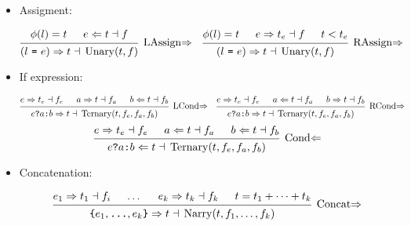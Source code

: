 \documentclass{article}
\DeclareMathOperator{\Unary}{Unary}
\DeclareMathOperator{\Ternary}{Ternary}
\DeclareMathOperator{\Narry}{Narry}
\renewcommand{\S}{\ensuremath{\Rightarrow}}
\newcommand{\C}{\ensuremath{\Leftarrow}}
\newcommand{\s}[3]{#1 \S{} #2 \dashv{} #3}
\renewcommand{\c}[3]{#1 \C{} #2 \dashv{} #3}
\begin{document}
\begin{itemize}[leftmargin=*]
	\item Assigment:

	      \begin{align*}
		       &
		      \begin{prooftree}
			      \hypo{\phi(l) = t}
			      \hypo{\c{e}{t}{f}}
			      \infer2[LAssign\S]{\s{(l~\texttt{=}~e)}{t}{\Unary(t, f)}}
		      \end{prooftree}
		       &
		       &
		      \begin{prooftree}
			      \hypo{\phi(l) = t}
			      \hypo{\s{e}{t_e}{f}}
			      \hypo{t < t_e}
			      \infer3[RAssign\S]{\s{(l~\texttt{=}~e)}{t}{\Unary(t, f)}}
		      \end{prooftree}
	      \end{align*}


	\item If expression:

	      \begin{align*}
		       &
		      \begin{prooftree}
			      \hypo{\s{e}{t_e}{f_e}}
			      \hypo{\s{a}{t}{f_a}}
			      \hypo{\c{b}{t}{f_b}}
			      \infer3[LCond\S]{\s{e \texttt{?} a \texttt{:} b}{t}%
				      {\Ternary(t, f_e, f_a, f_b)}}
		      \end{prooftree}
		       &
		       &
		      \begin{prooftree}
			      \hypo{\s{e}{t_e}{f_e}}
			      \hypo{\c{a}{t}{f_a}}
			      \hypo{\s{b}{t}{f_b}}
			      \infer3[RCond\S]{\s{e \texttt{?} a \texttt{:} b}{t}%
				      {\Ternary(t, f_e, f_a, f_b)}}
		      \end{prooftree}
	      \end{align*}
	      \vspace*{.5em}
	      \begin{equation*}
		      \begin{prooftree}
			      \hypo{\s{e}{t_e}{f_e}}
			      \hypo{\c{a}{t}{f_a}}
			      \hypo{\c{b}{t}{f_b}}
			      \infer3[Cond\C]{\c{e \texttt{?} a \texttt{:} b}{t}%
				      {\Ternary(t, f_e, f_a, f_b)}}
		      \end{prooftree}
	      \end{equation*}


	\item Concatenation:

	      \begin{equation*}
		      \begin{prooftree}
			      \hypo{\s{e_1}{t_1}{f_i}}
			      \hypo{\dots}
			      \hypo{\s{e_k}{t_k}{f_k}}
			      \hypo{t = t_1 + \cdots + t_k}
			      \infer4[Concat\S]
			      {\s{\texttt{\{}e_1, \texttt{\dots}, e_k \texttt{\}}}{t}
				      {\Narry(t, f_1, \dots, f_k)}}
		      \end{prooftree}
	      \end{equation*}



\end{itemize}
\end{document}
